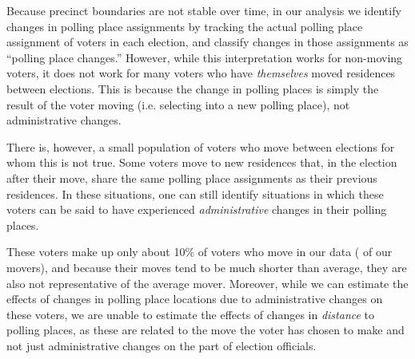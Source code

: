\documentclass{cup_PSRM}
\begin{document}
\noindent  Because precinct boundaries are not stable over time, in our analysis we identify changes in polling place assignments by tracking the actual polling place assignment of voters in each election, and classify changes in those assignments as ``polling place changes.'' However, while this interpretation works for non-moving voters, it does not work for many voters who have \emph{themselves} moved residences between elections.  This is because the change in polling places is simply the result of the voter moving (i.e. selecting into a new polling place), not administrative changes.

There is, however, a small population of voters who move between elections for whom this is not true. Some voters move to new residences that, in the election after their move, share the same polling place assignments as their previous residences. In these situations, one can still identify situations in which these voters can be said to have experienced \emph{administrative} changes in their polling places.

These voters make up only about 10\% of voters who move in our data ( of our  movers), and because their moves tend to be much shorter than average, they are also not representative of the average mover. Moreover, while we can estimate the effects of changes in polling place locations due to administrative changes on these voters, we are unable to estimate the effects of changes in \emph{distance} to polling places, as these are related to the move the voter has chosen to make and not just administrative changes on the part of election officials.


\end{document}
